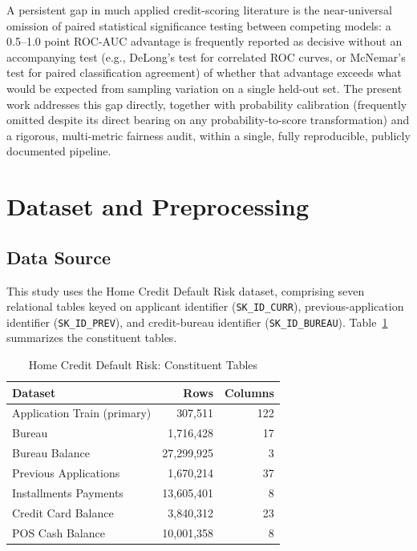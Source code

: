 \documentclass[journal]{IEEEtran}
\begin{document}
A persistent gap in much applied credit-scoring literature is the near-universal omission of paired statistical significance testing between competing models: a 0.5--1.0 point ROC-AUC advantage is frequently reported as decisive without an accompanying test (e.g., DeLong's test for correlated ROC curves, or McNemar's test for paired classification agreement) of whether that advantage exceeds what would be expected from sampling variation on a single held-out set. The present work addresses this gap directly, together with probability calibration (frequently omitted despite its direct bearing on any probability-to-score transformation) and a rigorous, multi-metric fairness audit, within a single, fully reproducible, publicly documented pipeline.

\section{Dataset and Preprocessing}
\label{sec:data}

\subsection{Data Source}

This study uses the Home Credit Default Risk dataset, comprising seven relational tables keyed on applicant identifier (\texttt{SK\_ID\_CURR}), previous-application identifier (\texttt{SK\_ID\_PREV}), and credit-bureau identifier (\texttt{SK\_ID\_BUREAU}). Table~\ref{tab:datasets} summarizes the constituent tables.

\begin{table}[!t]
\caption{Home Credit Default Risk: Constituent Tables}
\label{tab:datasets}
\centering
\begin{tabular}{lrr}
\toprule
Dataset & Rows & Columns \\
\midrule
Application Train (primary) & 307,511 & 122 \\
Bureau & 1,716,428 & 17 \\
Bureau Balance & 27,299,925 & 3 \\
Previous Applications & 1,670,214 & 37 \\
Installments Payments & 13,605,401 & 8 \\
Credit Card Balance & 3,840,312 & 23 \\
POS Cash Balance & 10,001,358 & 8 \\
\bottomrule
\end{tabular}
\end{table}
\end{document}
